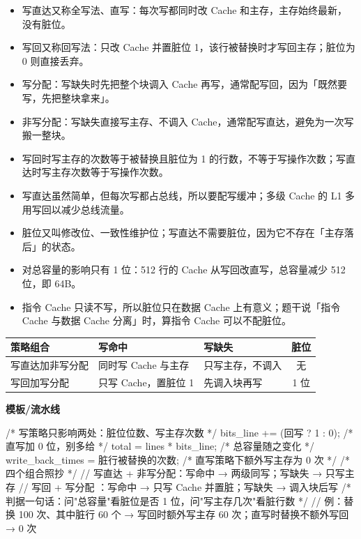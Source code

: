 \documentclass[10pt,a4paper]{ctexart}
\begin{document}
\begin{itemize}

\item 写直达又称全写法、直写：每次写都同时改 Cache 和主存，主存始终最新，没有脏位。

\item 写回又称回写法：只改 Cache 并置脏位 1，该行被替换时才写回主存；脏位为 0 则直接丢弃。

\item 写分配：写缺失时先把整个块调入 Cache 再写，通常配写回，因为「既然要写，先把整块拿来」。

\item 非写分配：写缺失直接写主存、不调入 Cache，通常配写直达，避免为一次写搬一整块。

\item 写回时写主存的次数等于被替换且脏位为 1 的行数，不等于写操作次数；写直达时写主存次数等于写操作次数。

\item 写直达虽然简单，但每次写都占总线，所以要配写缓冲；多级 Cache 的 L1 多用写回以减少总线流量。

\item 脏位又叫修改位、一致性维护位；写直达不需要脏位，因为它不存在「主存落后」的状态。

\item 对总容量的影响只有 1 位：512 行的 Cache 从写回改直写，总容量减少 512 位，即 64B。

\item 指令 Cache 只读不写，所以脏位只在数据 Cache 上有意义；题干说「指令 Cache 与数据 Cache 分离」时，算指令 Cache 可以不配脏位。

\end{itemize}

\begin{center}\small
\begin{tabularx}{\linewidth}{@{}l>{\raggedright\arraybackslash}Xlc@{}}
\toprule
策略组合 & 写命中 & 写缺失 & 脏位 \\
\midrule
写直达加非写分配 & 同时写 Cache 与主存 & 只写主存，不调入 & 无 \\
写回加写分配 & 只写 Cache，置脏位 1 & 先调入块再写 & 1 位 \\
\bottomrule
\end{tabularx}
\end{center}

\textbf{模板/流水线}

\begin{codebox}
/* 写策略只影响两处：脏位位数、写主存次数 */
bits_line += (回写 ? 1 : 0);            /* 直写加 0 位，别多给 */
total = lines * bits_line;              /* 总容量随之变化 */
write_back_times = 脏行被替换的次数;      /* 直写策略下额外写主存为 0 次 */
/* 四个组合照抄 */
// 写直达 + 非写分配：写命中 → 两级同写；写缺失 → 只写主存
// 写回   + 写分配  ：写命中 → 只写 Cache 并置脏；写缺失 → 调入块后写
/* 判据一句话：问"总容量"看脏位是否 1 位，问"写主存几次"看脏行数 */
// 例：替换 100 次、其中脏行 60 个 → 写回时额外写主存 60 次；直写时替换不额外写回 → 0 次
\end{codebox}
\end{document}
